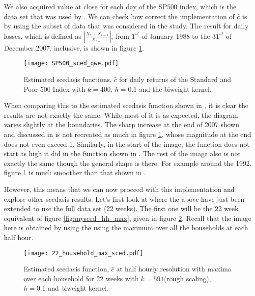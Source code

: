 \documentclass[a4paper]{article}
\begin{document}


We also acquired value at close for each day of the SP500 index, which is the data set that was used by \cite{einmahl16}. We can check how correct the implementation of $\hat{c}$ is by using the subset of data that was considered in the study. The result for daily losses, which is defined as $|\frac{X_t - X_{t-1}}{X_{t-1}}|$, from $1^{st}$ of January 1988 to the $31^{st}$ of December 2007, inclusive, is shown in figure \ref{fig:SP500_sced_daily}.

\begin{figure}
\centering
\texttt{[image: SP500\_sced\_qwe.pdf]}
\caption{\label{fig:SP500_sced_daily} Estimated scedasis functions, $\hat{c}$ for daily returns of the Standard and Poor 500 Index with $k=400$, $h=0.1$ and the biweight kernel.}
\end{figure}

When comparing this to the estimated scedasis function shown in \cite{einmahl16}, it is clear the results are not exactly the same. While most of it is as expected, the diagram varies slightly at the boundaries. The sharp increase at the end of 2007 shown and discussed in \cite{einmahl16} is not recreated as much in figure \ref{fig:SP500_sced_daily}, whose magnitude at the end does not even exceed 1. Similarly, in the start of the image, the function does not start as high it did in the function shown in \cite{einmahl16}. The rest of the image also is not exactly the same though the general shape is there. For example around the 1992, figure \ref{fig:SP500_sced_daily} is much smoother than that shown in \cite{einmahl16}.

However, this means that we can now proceed with this implementation and explore other scedasis results. Let's first look at where the above have just been extended to use the full data set (22 weeks). The first one will be the 22 week equivalent of figure \ref{fig:mysced_hh_max}, given in figure \ref{fig:mysced_hh_max_22}. Recall that the image here is obtained by using the using the maximum over all the households at each half hour.

\begin{figure}
\centering
\texttt{[image: 22\_household\_max\_sced.pdf]}
\caption{\label{fig:mysced_hh_max_22} Estimated scedasis function, $\hat{c}$ at half hourly resolution with maxima over each household for 22 weeks with $k=591$(rough scaling), $h=0.1$ and biweight kernel.}
\end{figure}
\end{document}

